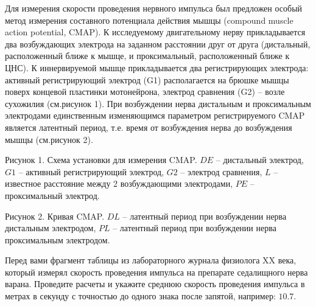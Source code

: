 
Для
измерения скорости проведения нервного импульса был предложен особый метод
измерения составного потенциала действия мышцы (compound muscle action
potential, CMAP). К исследуемому
двигательному нерву прикладывается два возбуждающих электрода на заданном
расстоянии друг от друга (дистальный,
расположенный ближе к мышце, и проксимальный,
расположенный ближе к ЦНС). К иннервируемой мышце прикладывается два
регистрирующих электрода: активный
регистрирующий электрод (G1) располагается на брюшке мышцы поверх концевой
пластинки мотонейрона, электрод
сравнения (G2) – возле сухожилия (см.рисунок 1). При возбуждении нерва
дистальным и проксимальным электродами единственным изменяющимся параметром
регистрируемого CMAP является латентный период, т.е. время от возбуждения нерва
до возбуждения мышцы (см.рисунок 2).


Рисунок
1. Схема установки для измерения CMAP. $DE$ – дистальный электрод, $G1$ – активный
регистрирующий электрод, $G2$ – электрод сравнения, $L$ – известное расстояние
между 2 возбуждающими электродами, $PE$ – проксимальный электрод.


Рисунок
2. Кривая CMAP. $DL$  – латентный период при возбуждении нерва дистальным электродом,
$PL$  – латентный период при возбуждении нерва проксимальным электродом.

Перед вами фрагмент таблицы из лабораторного
журнала физиолога XX века, который измерял скорость проведения импульса на
препарате седалищного нерва варана. Проведите расчеты и укажите среднюю
скорость проведения импульса в метрах в секунду с точностью до одного знака
после запятой, например: $10.7$.  


